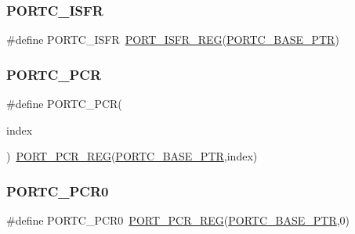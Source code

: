 \subsubsection{\texorpdfstring{P\+O\+R\+T\+C\+\_\+\+I\+S\+FR}{PORTC\_ISFR}}
{\footnotesize\ttfamily \#define P\+O\+R\+T\+C\+\_\+\+I\+S\+FR~\hyperlink{group___p_o_r_t___register___accessor___macros_ga71010d47c68b6ac12dbc646ad2cd5a2f}{P\+O\+R\+T\+\_\+\+I\+S\+F\+R\+\_\+\+R\+EG}(\hyperlink{group___p_o_r_t___peripheral_ga03c740cdda17711afafc932723871474}{P\+O\+R\+T\+C\+\_\+\+B\+A\+S\+E\+\_\+\+P\+TR})}

\mbox{\label{group___p_o_r_t___register___accessor___macros_ga75241e82a338f32753a385c88421a30e}} 
\subsubsection{\texorpdfstring{P\+O\+R\+T\+C\+\_\+\+P\+CR}{PORTC\_PCR}}
{\footnotesize\ttfamily \#define P\+O\+R\+T\+C\+\_\+\+P\+CR(\begin{DoxyParamCaption}\item[{}]{index }\end{DoxyParamCaption})~\hyperlink{group___p_o_r_t___register___accessor___macros_ga7a4a549c0ffd6b98b9fbfc0bdcfb5cea}{P\+O\+R\+T\+\_\+\+P\+C\+R\+\_\+\+R\+EG}(\hyperlink{group___p_o_r_t___peripheral_ga03c740cdda17711afafc932723871474}{P\+O\+R\+T\+C\+\_\+\+B\+A\+S\+E\+\_\+\+P\+TR},index)}

\mbox{\label{group___p_o_r_t___register___accessor___macros_gad8614ff2adb409afcdb871899764dee8}} 
\subsubsection{\texorpdfstring{P\+O\+R\+T\+C\+\_\+\+P\+C\+R0}{PORTC\_PCR0}}
{\footnotesize\ttfamily \#define P\+O\+R\+T\+C\+\_\+\+P\+C\+R0~\hyperlink{group___p_o_r_t___register___accessor___macros_ga7a4a549c0ffd6b98b9fbfc0bdcfb5cea}{P\+O\+R\+T\+\_\+\+P\+C\+R\+\_\+\+R\+EG}(\hyperlink{group___p_o_r_t___peripheral_ga03c740cdda17711afafc932723871474}{P\+O\+R\+T\+C\+\_\+\+B\+A\+S\+E\+\_\+\+P\+TR},0)}

